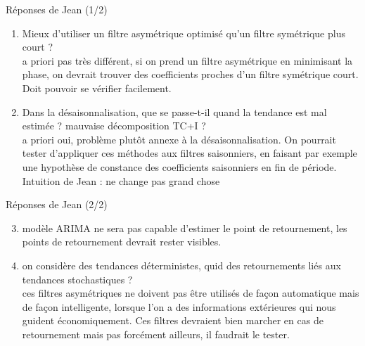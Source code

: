 \documentclass[10pt,xcolor=table,color={dvipsnames,usenames},ignorenonframetext,usepdftitle=false,french]{beamer}
\begin{document}
\begin{frame}{Réponses de Jean (1/2)}
\protect\hypertarget{ruxe9ponses-de-jean-12}{}

\begin{enumerate}
\item
  Mieux d'utiliser un filtre asymétrique optimisé qu'un filtre
  symétrique plus court ?\\
  \faArrowCircleRight{} a priori pas très différent, si on prend un
  filtre asymétrique en minimisant la phase, on devrait trouver des
  coefficients proches d'un filtre symétrique court. Doit pouvoir se
  vérifier facilement.
\item
  Dans la désaisonnalisation, que se passe-t-il quand la tendance est
  mal estimée ? mauvaise décomposition TC+I ?\\
  \faArrowCircleRight{} a priori oui, problème plutôt annexe à la
  désaisonnalisation. On pourrait tester d'appliquer ces méthodes aux
  filtres saisonniers, en faisant par exemple une hypothèse de constance
  des coefficients saisonniers en fin de période.\\
  Intuition de Jean : ne change pas grand chose
\end{enumerate}

\end{frame}

\begin{frame}{Réponses de Jean (2/2)}
\protect\hypertarget{ruxe9ponses-de-jean-22}{}

\begin{enumerate}
\setcounter{enumi}{2}
\item
  \faArrowCircleRight{} modèle ARIMA ne sera pas capable d'estimer le
  point de retournement, les points de retournement devrait rester
  visibles.
\item
  on considère des tendances déterministes, quid des retournements liés
  aux tendances stochastiques ?\\
  \faArrowCircleRight{} ces filtres asymétriques ne doivent pas être
  utilisés de façon automatique mais de façon intelligente, lorsque l'on
  a des informations extérieures qui nous guident économiquement. Ces
  filtres devraient bien marcher en cas de retournement mais pas
  forcément ailleurs, il faudrait le tester.
\end{enumerate}

\end{frame}
\end{document}
